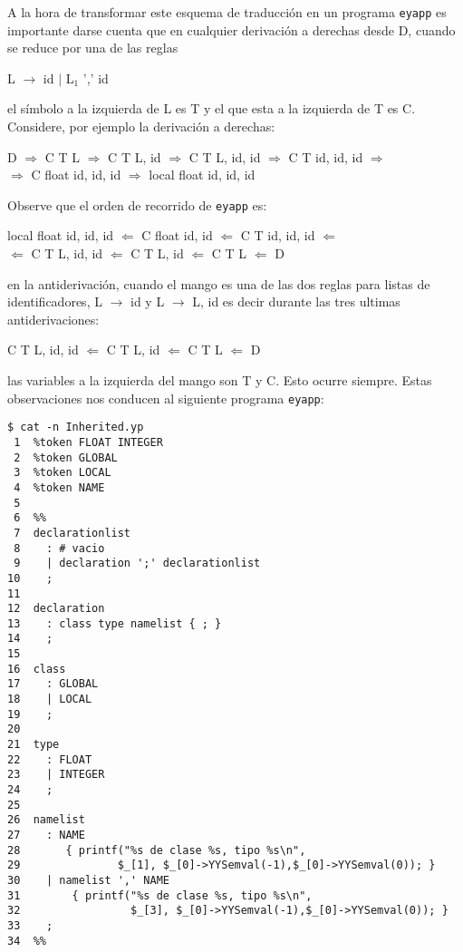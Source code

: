 A la hora de transformar este esquema de traducción en un programa
\verb|eyapp| es importante darse cuenta que en cualquier derivación a derechas
desde D, cuando se reduce por una de las reglas 

\begin{center}
L $\rightarrow$ id $|$ L$_1$  ',' id
\end{center}

el símbolo a la izquierda de L es T y el que esta a la izquierda de T es C.
Considere, por ejemplo la derivación a derechas:

\begin{center}
D $\Longrightarrow$ C T L $\Longrightarrow$ C T L, id $\Longrightarrow$ C T L, id, id
$\Longrightarrow$ C T id, id, id $\Longrightarrow$ \\
$\Longrightarrow$ C float id, id, id $\Longrightarrow$ local float id, id, id
\end{center}

\noindent Observe que el orden de recorrido de \verb|eyapp| es:
\begin{center}
local float id, id, id $\Longleftarrow$ C float id, id $\Longleftarrow$
C T id, id, id $\Longleftarrow$\\
$\Longleftarrow$ C T L, id, id $\Longleftarrow$ C T L, id $\Longleftarrow$ C T L $\Longleftarrow$ D
\end{center}

\noindent en la antiderivación, cuando el mango es una de las dos reglas 
para listas de identificadores, L $\rightarrow$ id y L $\rightarrow$ L, id 
es decir durante las tres ultimas antiderivaciones:

\begin{center}
C T L, id, id $\Longleftarrow$ C T L, id $\Longleftarrow$ C T L $\Longleftarrow$ D
\end{center}

\noindent las variables a la izquierda del mango son
T y C. Esto ocurre siempre. 
Estas observaciones nos conducen al siguiente
programa \verb|eyapp|: 

\begin{verbatim}
$ cat -n Inherited.yp
 1  %token FLOAT INTEGER
 2  %token GLOBAL
 3  %token LOCAL
 4  %token NAME
 5
 6  %%
 7  declarationlist
 8    : # vacio
 9    | declaration ';' declarationlist
10    ;
11
12  declaration
13    : class type namelist { ; }
14    ;
15
16  class
17    : GLOBAL
18    | LOCAL
19    ;
20
21  type
22    : FLOAT
23    | INTEGER
24    ;
25
26  namelist
27    : NAME
28       { printf("%s de clase %s, tipo %s\n",
29               $_[1], $_[0]->YYSemval(-1),$_[0]->YYSemval(0)); }
30    | namelist ',' NAME
31        { printf("%s de clase %s, tipo %s\n",
32                 $_[3], $_[0]->YYSemval(-1),$_[0]->YYSemval(0)); }
33    ;
34  %%
\end{verbatim}

